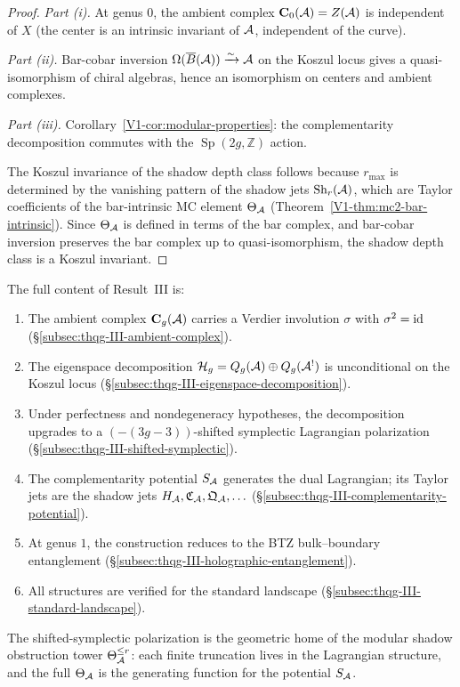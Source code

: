 \begin{proof}
\emph{Part (i).}
At genus $0$, the ambient complex
$\mathbf{C}_0(\mathcal{A}) = Z(\mathcal{A})$ is independent of $X$
(the center is an intrinsic invariant of $\mathcal{A}$,
independent of the curve).

\emph{Part (ii).}
Bar-cobar inversion
$\Omega(\overline{B}(\mathcal{A})) \xrightarrow{\sim} \mathcal{A}$ on the Koszul
locus gives a quasi-isomorphism of chiral algebras, hence
an isomorphism on centers and ambient complexes.

\emph{Part (iii).}
Corollary~\ref{V1-cor:modular-properties}: the complementarity
decomposition commutes with the $\operatorname{Sp}(2g, \mathbb{Z})$
action.

The Koszul invariance of the shadow depth class follows because
$r_{\max}$ is determined by the vanishing pattern of the shadow
jets $\mathrm{Sh}_r(\mathcal{A})$, which are Taylor coefficients of the
bar-intrinsic MC element $\Theta_{\mathcal{A}}$
(Theorem~\ref*{V1-thm:mc2-bar-intrinsic}). Since $\Theta_{\mathcal{A}}$ is
defined in terms of the bar complex, and bar-cobar inversion
preserves the bar complex up to quasi-isomorphism, the shadow
depth class is a Koszul invariant.
\end{proof}

\begin{remark}
The full content of Result~III is:
\begin{enumerate}[label=\textup{(\arabic*)}]
\item The ambient complex $\mathbf{C}_g(\mathcal{A})$ carries a
 Verdier involution $\sigma$ with $\sigma^2 = \mathrm{id}$
 (\S\ref{subsec:thqg-III-ambient-complex}).
\item The eigenspace decomposition
 $\mathcal{H}_g = Q_g(\mathcal{A}) \oplus Q_g(\mathcal{A}^!)$ is
 unconditional on the Koszul locus
 (\S\ref{subsec:thqg-III-eigenspace-decomposition}).
\item Under perfectness and nondegeneracy hypotheses,
 the decomposition upgrades to a $(-(3g-3))$-shifted
 symplectic Lagrangian polarization
 (\S\ref{subsec:thqg-III-shifted-symplectic}).
\item The complementarity potential $S_{\mathcal{A}}$ generates the
 dual Lagrangian; its Taylor jets are the shadow jets
 $H_{\mathcal{A}}, \mathfrak{C}_{\mathcal{A}}, \mathfrak{Q}_{\mathcal{A}}, \ldots$
 (\S\ref{subsec:thqg-III-complementarity-potential}).
\item At genus $1$, the construction reduces to the
 BTZ bulk--boundary entanglement
 (\S\ref{subsec:thqg-III-holographic-entanglement}).
\item All structures are verified for the standard landscape
 (\S\ref{subsec:thqg-III-standard-landscape}).
\end{enumerate}
The shifted-symplectic polarization is the geometric home of
the modular shadow obstruction tower $\Theta_{\mathcal{A}}^{\le r}$: each finite
truncation lives in the Lagrangian structure, and the full
$\Theta_{\mathcal{A}}$ is the generating function for the potential
$S_{\mathcal{A}}$.
\end{remark}

